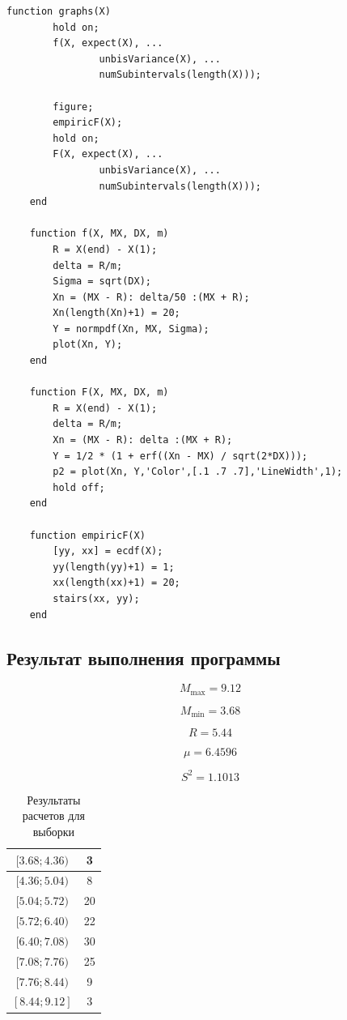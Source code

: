 \documentclass[12pt, a4paper]{report}
\begin{document}
	\begin{lstlisting}[caption=Отрисовка графов]
	function graphs(X)
		hold on;
		f(X, expect(X), ...
				unbisVariance(X), ...
				numSubintervals(length(X)));
	
		figure;
		empiricF(X);
		hold on;
		F(X, expect(X), ...
				unbisVariance(X), ...
				numSubintervals(length(X)));
	end
	
	function f(X, MX, DX, m)
		R = X(end) - X(1);
		delta = R/m;
		Sigma = sqrt(DX);
		Xn = (MX - R): delta/50 :(MX + R);
		Xn(length(Xn)+1) = 20;
		Y = normpdf(Xn, MX, Sigma);
		plot(Xn, Y);
	end
	
	function F(X, MX, DX, m)
		R = X(end) - X(1);
		delta = R/m;
		Xn = (MX - R): delta :(MX + R);
		Y = 1/2 * (1 + erf((Xn - MX) / sqrt(2*DX))); 
		p2 = plot(Xn, Y,'Color',[.1 .7 .7],'LineWidth',1);
		hold off;
	end
	
	function empiricF(X)  
		[yy, xx] = ecdf(X);
		yy(length(yy)+1) = 1;
		xx(length(xx)+1) = 20;
		stairs(xx, yy);
	end
	\end{lstlisting}
	
	
	\vspace{0.5cm}
	\subsection{Результат выполнения программы}
	
	\begin{equation*}
	M_{\max} = 9.12
	\end{equation*}
	
	\begin{equation*}
	M_{\min} = 3.68
	\end{equation*}
	
	\begin{equation*}
	R = 5.44
	\end{equation*}
	
	\begin{equation*}
	\mu = 6.4596
	\end{equation*}
	
	\begin{equation*}
	S^2 = 1.1013
	\end{equation*}
	
	\begin{table}[H]
		\centering
		\begin{tabular}{|c|c|}
			\hline
			$[3.68;4.36)$ & 3 \\
			\hline
			$[4.36;5.04)$ & 8 \\
			\hline
			$[5.04;5.72)$ & 20 \\
			\hline
			$[5.72;6.40)$ & 22 \\
			\hline
			$[6.40;7.08)$ & 30 \\
			\hline
			$[7.08;7.76)$ & 25 \\
			\hline
			$[7.76;8.44)$ & 9 \\
			\hline
			$[8.44;9.12]$ & 3 \\
			\hline
		\end{tabular}
		\caption{Результаты расчетов для выборки}
	\end{table}
\end{document}
